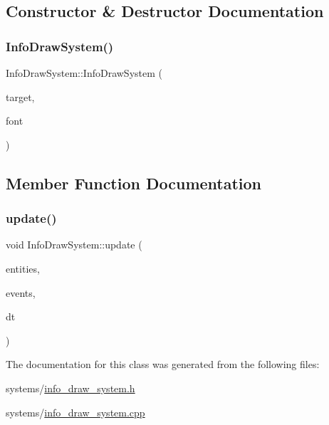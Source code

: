 \subsection{Constructor \& Destructor Documentation}
\mbox{\label{classInfoDrawSystem_a6ddca785e40f494d5973a8b957a76873}} 
\subsubsection{\texorpdfstring{Info\+Draw\+System()}{InfoDrawSystem()}}
{\footnotesize\ttfamily Info\+Draw\+System\+::\+Info\+Draw\+System (\begin{DoxyParamCaption}\item[{sf\+::\+Render\+Target \&}]{target,  }\item[{sf\+::\+Font \&}]{font }\end{DoxyParamCaption})\hspace{0.3cm}{\ttfamily [explicit]}}



\subsection{Member Function Documentation}
\mbox{\label{classInfoDrawSystem_aac0a0e5f1595857ca8ab47c17ea3e62e}} 
\subsubsection{\texorpdfstring{update()}{update()}}
{\footnotesize\ttfamily void Info\+Draw\+System\+::update (\begin{DoxyParamCaption}\item[{ex\+::\+Entity\+Manager \&}]{entities,  }\item[{ex\+::\+Event\+Manager \&}]{events,  }\item[{ex\+::\+Time\+Delta}]{dt }\end{DoxyParamCaption})\hspace{0.3cm}{\ttfamily [override]}}



The documentation for this class was generated from the following files\+:\begin{DoxyCompactItemize}
\item 
systems/\hyperlink{info__draw__system_8h}{info\+\_\+draw\+\_\+system.\+h}\item 
systems/\hyperlink{info__draw__system_8cpp}{info\+\_\+draw\+\_\+system.\+cpp}\end{DoxyCompactItemize}
